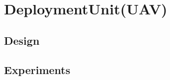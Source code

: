 \section{DeploymentUnit(UAV)}\label{sec:DeploymentUnit(UAV)}

\subsection{Design}

\subsection{Experiments}

